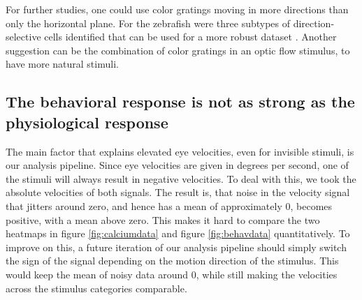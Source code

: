 

\vspace{\baselineskip}

For further studies, one could use color gratings moving in more directions than only the horizontal plane. For the zebrafish were three subtypes of direction-selective cells identified that can be used for a more robust dataset \parencite{nikolaou2012parametric}. Another suggestion can be the combination of color gratings in an optic flow stimulus, to have more natural stimuli. 

\subsection{The behavioral response is not as strong as the physiological response}


The main factor that explains elevated eye velocities, even for invisible stimuli, is our analysis pipeline. Since eye velocities are given in degrees per second, one of the stimuli will always result in negative velocities. To deal with this, we took the absolute velocities of both signals. The result is, that noise in the velocity signal that jitters around zero, and hence has a mean of approximately 0, becomes positive, with a mean above zero. This makes it hard to compare the two heatmaps in figure \ref{fig:calciumdata} and figure \ref{fig:behavdata} quantitatively. To improve on this, a future iteration of our analysis pipeline should simply switch the sign of the signal depending on the motion direction of the stimulus. This would keep the mean of noisy data around 0, while still making the velocities across the stimulus categories comparable.

